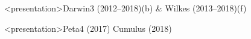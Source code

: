 \begin{frame}<presentation>{Darwin3 (2012--2018)(b) \& Wilkes (2013--2018)(f)}
%
\smallskip
\end{frame}

\begin{frame}<presentation>{Peta4 (2017) Cumulus (2018)}
%
\smallskip
\end{frame}




